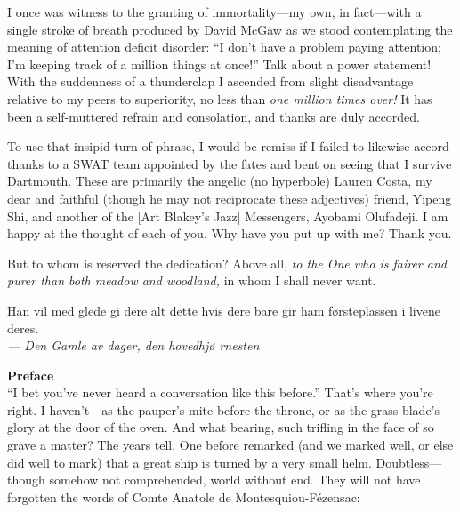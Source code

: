 I once was witness to the granting of immortality---my own, in fact---with a
single stroke of breath produced by David McGaw as we stood contemplating the
meaning of attention deficit disorder: ``I don't have a problem paying
attention; I'm keeping track of a million things at once!''  Talk about a power
statement! With the suddenness of a thunderclap I ascended from slight
disadvantage relative to my peers to superiority, no less than \emph{one million
  times over!}  It has been a self-muttered refrain and consolation, and thanks
are duly accorded.

To use that insipid turn of phrase, I would be remiss if I failed to likewise
accord thanks to a SWAT team appointed by the fates and bent on seeing that I
survive Dartmouth. These are primarily the angelic (no hyperbole) Lauren Costa,
my dear and faithful (though he may not reciprocate these adjectives) friend,
Yipeng Shi, and another of the [Art Blakey's Jazz] Messengers, Ayobami
Olufadeji. I am happy at the thought of each of you. Why have you put up with
me? Thank you.

But to whom is reserved the dedication? Above all, \emph{to the One who is
  fairer and purer than both meadow and woodland,} in whom I shall never want.

\newpage

\begin{flushright}
\begin{minipage}[]{0.55\linewidth}
    \begin{flushright}
      Han vil med glede gi dere alt dette hvis dere bare gir ham f\o rsteplassen
      i livene deres. \\{\small \emph{--- Den Gamle av dager, den hovedhj\o
          rnesten} }
    \end{flushright}
\end{minipage}
\end{flushright}

{\Huge \bf Preface} \\

``I bet you've never heard a conversation like this before.'' That's
where you're right. I haven't---as the pauper's mite before the
throne, or as the grass blade's glory at the door of the
oven. And what bearing, such trifling in the face of so grave a matter?  The
years tell. One before remarked (and we marked well, or else did well to mark)
that a great ship is turned by a very small helm. Doubtless---though somehow not
comprehended, world without end. They will not have forgotten the words of Comte
Anatole de Montesquiou-F\'{e}zensac:

